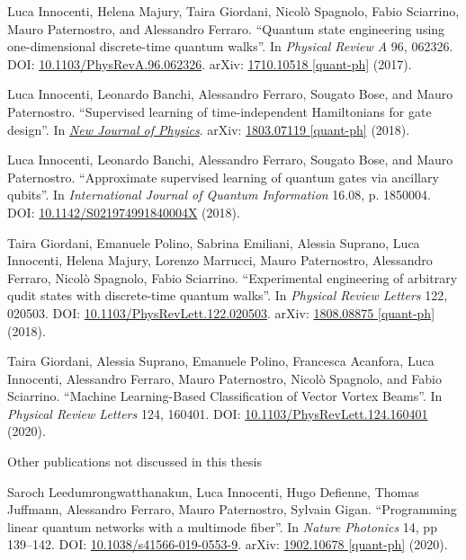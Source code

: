 \documentclass[12pt,twoside]{report}
\begin{document}


{\renewcommand{\bibname}{List of publications}
\begin{thebibliography}{9}

Luca Innocenti, Helena Majury, Taira Giordani, Nicolò Spagnolo, Fabio Sciarrino, Mauro Paternostro, and Alessandro Ferraro. ``Quantum state engineering using one-dimensional discrete-time quantum walks''. In \emph{Physical Review A} 96, 062326. {\footnotesize\scshape DOI:} \href{https://doi.org/10.1103/PhysRevA.96.062326}{10.1103/PhysRevA.96.062326}. arXiv: \href{https://arxiv.org/abs/1710.10518}{1710.10518 [quant-ph]} (2017).

Luca Innocenti, Leonardo Banchi, Alessandro Ferraro, Sougato Bose, and Mauro Paternostro. ``Supervised learning of time-independent Hamiltonians for gate design''. In \emph{\href{https://iopscience.iop.org/article/10.1088/1367-2630/ab8aaf}{New Journal of Physics}}. arXiv: \href{https://arxiv.org/abs/1803.07119}{1803.07119 [quant-ph]} (2018).

Luca Innocenti, Leonardo Banchi, Alessandro Ferraro, Sougato Bose, and Mauro Paternostro. ``Approximate supervised learning of quantum gates via ancillary qubits''. In \emph{International Journal of Quantum Information} 16.08, p. 1850004. {\footnotesize\scshape DOI:} \href{https://doi.org/10.1142/S021974991840004X}{10.1142/S021974991840004X} (2018).

Taira Giordani, Emanuele Polino, Sabrina Emiliani, Alessia Suprano, Luca Innocenti, Helena Majury, Lorenzo Marrucci, Mauro Paternostro, Alessandro Ferraro, Nicolò Spagnolo, Fabio Sciarrino. ``Experimental engineering of arbitrary qudit states with discrete-time quantum walks''. In \emph{Physical Review Letters} 122, 020503. {\footnotesize\scshape DOI:} \href{https://doi.org/10.1103/PhysRevLett.122.020503}{10.1103/PhysRevLett.122.020503}. arXiv: \href{https://arxiv.org/abs/1808.08875}{1808.08875 [quant-ph]} (2018).

Taira Giordani, Alessia Suprano, Emanuele Polino, Francesca Acanfora, Luca Innocenti, Alessandro Ferraro, Mauro Paternostro, Nicolò Spagnolo, and Fabio Sciarrino. ``Machine Learning-Based Classification of Vector Vortex Beams''. In \emph{Physical Review Letters} 124, 160401. {\footnotesize\scshape DOI:} \href{https://doi.org/10.1103/PhysRevLett.124.160401}{10.1103/PhysRevLett.124.160401} (2020).

\medskip
{\Large Other publications not discussed in this thesis}
\medskip

Saroch Leedumrongwatthanakun, Luca Innocenti, Hugo Defienne, Thomas Juffmann, Alessandro Ferraro, Mauro Paternostro, Sylvain Gigan. ``Programming linear quantum networks with a multimode fiber''. In \emph{Nature Photonics} 14, pp 139–142. {\footnotesize\scshape DOI:} \href{https://doi.org/10.1038/s41566-019-0553-9}{10.1038/s41566-019-0553-9}. arXiv: \href{https://arxiv.org/abs/1902.10678}{1902.10678 [quant-ph]} (2020).

\end{thebibliography}}
\end{document}
